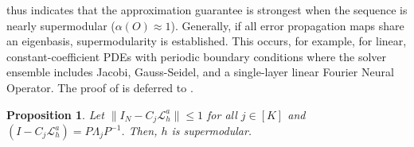 \documentclass{article}
\newtheorem{proposition}[theorem]{Proposition}
\begin{document}

 thus indicates that the approximation guarantee is strongest when the sequence is nearly supermodular ($\alpha(O) \approx 1$). Generally, if all error propagation maps share an eigenbasis,
supermodularity is established.
This occurs, for example, for linear, constant-coefficient PDEs with periodic boundary conditions where the solver ensemble includes Jacobi, Gauss-Seidel, and  a single-layer linear Fourier Neural Operator. 
The proof of  is deferred to .
\begin{proposition} \label{th:simultaneoussupermodular}
    Let $\|I_N - C_j\mathcal{L}_h^a\| \leq 1$ for all $j \in [K]$ and $\left(I - C_j \mathcal{L}_{h}^a\right) = P\Lambda_jP^{-1}$. Then, $h$ is supermodular. 
\end{proposition}
\end{document}
